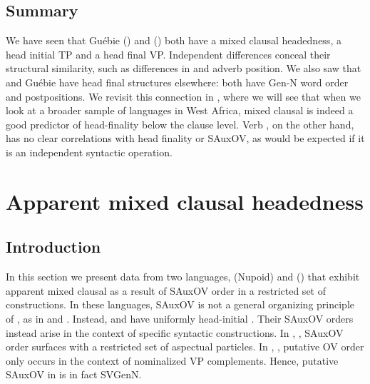 \documentclass[output=paper,newtxmath,modfonts,nonflat,draftmode]{langsci/langscibook}
\begin{document}
\subsection{Summary}

We have seen that Guébie () and  () both have a mixed clausal headedness, a head initial TP and a head final VP. Independent differences conceal their structural similarity, such as differences in  and adverb position. We also saw that  and Guébie have head final structures elsewhere: both have Gen-N word order and postpositions. We revisit this connection in , where we will see that when we look at a broader sample of languages in West Africa, mixed clausal  is indeed a good predictor of head-finality below the clause level. Verb , on the other hand, has no clear correlations with head finality or SAuxOV, as would be expected if it is an independent syntactic operation.

\section{Apparent mixed clausal headedness} 
\label{sec:fake}

\subsection{Introduction}

In this section we present data from two languages,  (Nupoid) and  () that exhibit apparent mixed clausal  as a result of SAuxOV order in a restricted set of constructions. In these languages, SAuxOV is not a general organizing principle of , as in  and . Instead,  and  have uniformly head-initial . Their SAuxOV orders instead arise in the context of specific syntactic constructions. In , , SAuxOV order surfaces with a restricted set of aspectual particles. In , , putative OV order only occurs in the context of nominalized VP complements. Hence, putative SAuxOV in  is in fact SVGenN. 
\end{document}
